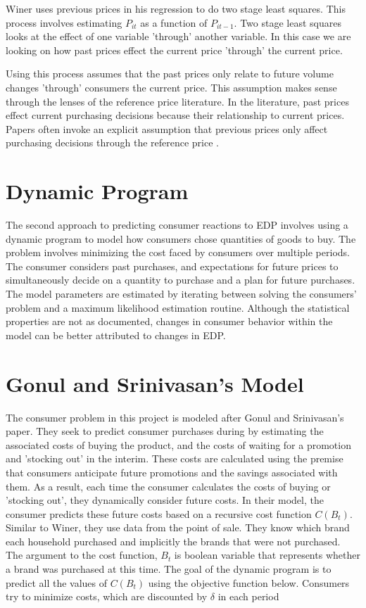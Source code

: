 \documentclass{article}
\begin{document}
Winer uses previous prices in his regression to do two stage least squares. This process involves estimating ${P}_{it}$ as a function of ${P}_{it-1}$. Two stage least squares looks at the effect of one variable 'through' another variable.  In this case we are looking on how past prices effect the current price 'through' the current price. 

Using this process assumes that the past prices only relate to future volume changes 'through' consumers the current price. This assumption makes sense through the lenses of the reference price literature. In the literature, past prices effect current purchasing decisions because their relationship to current prices. Papers often invoke an explicit assumption that previous prices only affect purchasing decisions through the reference price \cite{putler}.

\section{Dynamic Program}

The second approach to predicting consumer reactions to EDP involves using a dynamic program to model how consumers chose quantities of goods to buy. The problem involves minimizing the cost faced by consumers over multiple periods. The consumer considers past purchases, and expectations for future prices to simultaneously decide on a quantity to purchase and a plan for future purchases. The model parameters are estimated by iterating between solving the consumers' problem and a maximum likelihood estimation routine. Although the statistical properties are not as documented, changes in consumer behavior within the model can be better attributed to changes in EDP.

\section{Gonul and Srinivasan's Model}

The consumer problem in this project is modeled after Gonul and Srinivasan's paper\cite{gonul}. They seek to predict consumer purchases during by estimating the associated costs of buying the product, and the costs of waiting for a promotion and 'stocking out' in the interim. These costs are calculated using the premise that consumers anticipate future promotions and the savings associated with them. As a result, each time the consumer calculates the costs of buying or 'stocking out', they dynamically consider future costs. In their model, the consumer predicts these future costs based on a recursive cost function $C(B_t)$.  Similar to Winer, they use data from the point of sale. They know which brand each household purchased and implicitly the brands that were not purchased. The argument to the cost function, $B_t$ is boolean variable that represents whether a brand was purchased at this time. The goal of the dynamic program is to predict all the values of $C(B_t)$ using the objective function below. Consumers try to minimize costs, which are discounted by $\delta$ in each period
\end{document}
